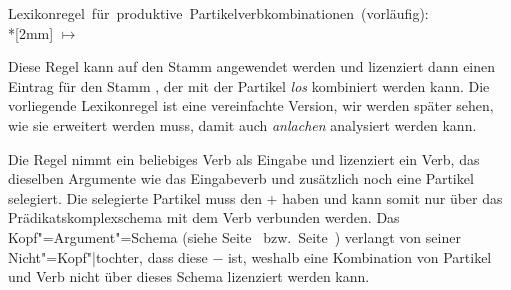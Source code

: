 \eas
\label{lr-pv-prel}%
\mbox{Lexikonregel für produktive Partikelverbkombinationen (vorläufig):}\\*[2mm]
\onems[stem]{
           synsem \ibox{1} \onems{ loc$|$cat \ms{ head & \type{verb} \\ 
                                                  comps & \ibox{2}\\
}
                                 } \\
         }  $\mapsto$ \\
%
%
\zs

\noindent
Diese Regel kann auf den Stamm  angewendet werden
und lizenziert dann einen Eintrag für den Stamm , der mit der Partikel \emph{los}
kombiniert werden kann. Die vorliegende Lexikonregel ist eine vereinfachte Version, wir
werden später sehen, wie sie erweitert werden muss, damit auch \emph{anlachen}
analysiert werden kann.


Die Regel nimmt ein beliebiges Verb als Eingabe und lizenziert ein Verb,
das dieselben Argumente wie das Eingabeverb und zusätzlich noch eine Partikel selegiert.
Die selegierte Partikel muss den \lexw + haben und kann somit nur über
das Prädikatskomplexschema mit dem Verb verbunden werden. Das Kopf"=Argument"=Schema
(siehe Seite~\pageref{schema-bin} bzw.\ Seite~\pageref{schema-bin-mark-final}) verlangt von seiner
Nicht"=Kopf"|tochter, dass diese \lex$-$ ist, weshalb eine Kombination von Partikel und Verb nicht
über dieses Schema lizenziert werden kann.

